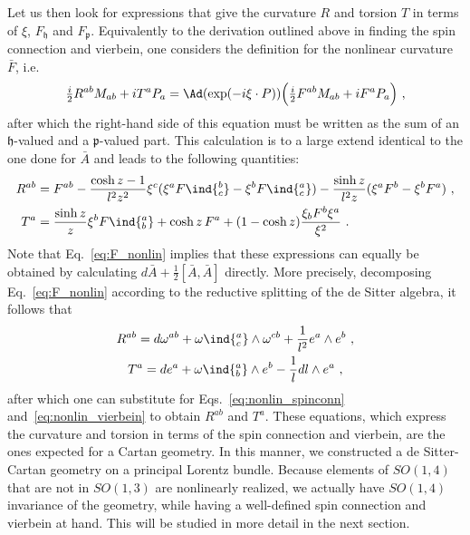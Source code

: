 \documentclass[11pt]{article}
\begin{document}
Let us then look for expressions that give the curvature $R$ and 
torsion $T$ in terms of $\xi$, $F_\mathfrak{h}$ and 
$F_\mathfrak{p}$. Equivalently to the derivation outlined above 
in finding the spin connection and vierbein, one considers the 
definition for the nonlinear curvature $\bar{F}$, i.e.
\begin{displaymath}
	\tfrac{i}{2} R^{ab} M_{ab} + i T^a P_a
	= \Ad(\exp(-i\xi\cdot P)) \Big( \tfrac{i}{2} F^{ab} M_{ab} + i 
	F^a P_a \Big)~,
\end{displaymath}
after which the right-hand side of this equation must be written 
as the sum of an $\mathfrak{h}$-valued and a 
$\mathfrak{p}$-valued part. This calculation is to a large extend 
identical to the one done for $\bar{A}$ and leads to the 
following quantities:
\begin{subequations}
\label{eqs:nonlin_curv_tors}
\begin{align}
\label{eq:nonlin_curv}
	R^{ab} &= F^{ab} - \frac{\cosh z - 1}{l^2 z^2} \xi^c (\xi^a 
	F\ind{^b_c} -  \xi^b F\ind{^a_c}) - \frac{\sinh z}{l^2 z} 
	(\xi^a F^b - \xi^b F^a)~,
\\
\label{eq:nonlin_tors}
	T^a &= \frac{\sinh z}{z} \xi^b F\ind{^a_b} + \cosh z\, F^a + 
	(1 - \cosh z) \frac{\xi_b F^b \xi^a}{\xi^2}~.
\end{align}
\end{subequations}
Note that Eq.~\eqref{eq:F_nonlin} implies that these expressions 
can equally be obtained by calculating $d\bar{A} + 
\tfrac{1}{2}[\bar{A},\bar{A}]$ directly. More precisely, 
decomposing Eq.~\eqref{eq:F_nonlin} according to the reductive 
splitting of the de Sitter algebra, it follows that
\begin{gather*}
	R^{ab} = d\omega^{ab} + \omega\ind{^a_c} \wedge \omega^{cb} + 
	\frac{1}{l^2} e^a \wedge e^b~,
	\\
	T^a = de^a + \omega\ind{^a_b} \wedge e^b - \frac{1}{l} dl 
	\wedge e^a~,
\end{gather*}
after which one can substitute for 
Eqs.~\eqref{eq:nonlin_spinconn} and~\eqref{eq:nonlin_vierbein} to 
obtain $R^{ab}$ and $T^a$. These equations, which express the 
curvature and torsion in terms of the spin connection and 
vierbein, are the ones expected for a Cartan geometry. In this 
manner, we constructed a de Sitter-Cartan geometry on a principal 
Lorentz bundle. Because elements of $SO(1,4)$ that are not in 
$SO(1,3)$ are nonlinearly realized, we actually have $SO(1,4)$ 
invariance of the geometry, while having a well-defined spin 
connection and vierbein at hand. This will be studied in more 
detail in the next section.
\end{document}

